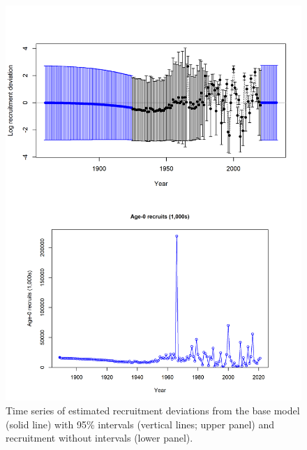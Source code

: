 \documentclass[11pt,
  english,
  a4paper,
]{article}
\begin{document}
\begin{figure}
\centering
\includegraphics[width=1\textwidth,height=1\textheight]{figs/rec_panel.png}
\caption{Time series of estimated recruitment deviations from the base model (solid line) with 95\% intervals (vertical lines; upper panel) and recruitment without intervals (lower panel).\label{fig:ts11}}
\end{figure}

\tagmcend\tagstructend

\end{document}
